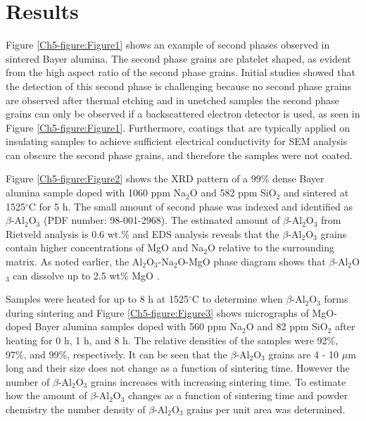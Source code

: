 \section{Results}
Figure \ref{Ch5-figure:Figure1} shows an example of second phases observed in sintered Bayer alumina. The second phase grains are platelet shaped, as evident from the high aspect ratio of the second phase grains. Initial studies showed that the detection of this second phase is challenging because no second phase grains are observed after thermal etching and in unetched samples the second phase grains can only be observed if a backscattered electron detector is used, as seen in Figure \ref{Ch5-figure:Figure1}. Furthermore, coatings that are typically applied on insulating samples to achieve sufficient electrical conductivity for SEM analysis can obscure the second phase grains, and therefore the samples were not coated.

Figure \ref{Ch5-figure:Figure2} shows the XRD pattern of a 99\% dense Bayer alumina sample doped with 1060 ppm Na$_{2}$O and 582 ppm SiO$_{2}$ and sintered at 1525$^{\circ}$C for 5 h. The small amount of second phase was indexed and identified as $\beta$-Al$_{2}$O$_{3}$ (PDF number: 98-001-2968). The estimated amount of $\beta$-Al$_{2}$O$_{3}$ from Rietveld analysis is 0.6 wt.\% and EDS analysis reveals that the $\beta$-Al$_{2}$O$_{3}$ grains contain higher concentrations of MgO and Na$_{2}$O relative to the surrounding matrix. As noted earlier, the Al$_{2}$O$_{3}$-Na$_{2}$O-MgO phase diagram shows that $\beta$-Al$_{2}$O$_{3}$ can dissolve up to 2.5 wt\% MgO \cite{Kummer1972a}.

Samples were heated for up to 8 h at 1525$^{\circ}$C to determine when $\beta$-Al$_{2}$O$_{3}$ forms during sintering and Figure \ref{Ch5-figure:Figure3} shows micrographs of MgO-doped Bayer alumina samples doped with 560 ppm Na$_{2}$O and 82 ppm SiO$_{2}$ after heating for 0 h, 1 h, and 8 h. The relative densities of the samples were 92\%, 97\%, and 99\%, respectively. It can be seen that the $\beta$-Al$_{2}$O$_{3}$ grains are 4 - 10 $\mu$m long and their size does not change as a function of sintering time. However the number of $\beta$-Al$_{2}$O$_{3}$ grains increases with increasing sintering time. To estimate how the amount of $\beta$-Al$_{2}$O$_{3}$ changes as a function of sintering time and powder chemistry the number density of $\beta$-Al$_{2}$O$_{3}$ grains per unit area was determined. 

